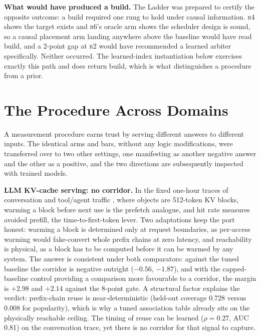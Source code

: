 \documentclass[letterpaper]{article} %
\newcommand{\rung}[1]{\textsc{#1}}
\begin{document}
\textbf{What would have produced a build.} The Ladder was prepared to certify the opposite outcome: a build required one rung to hold under causal information. \rung{r4} shows the target exists and \rung{r6}'s oracle arm shows the scheduler design is sound, so a causal placement arm landing anywhere above the baseline would have read build, and a 2-point gap at \rung{r2} would have recommended a learned arbiter specifically. Neither occurred. The learned-index instantiation below exercises exactly this path and does return build, which is what distinguishes a procedure from a prior.

\section{The Procedure Across Domains}
A measurement procedure earns trust by serving different answers to different inputs. The identical arms and bars, without any logic modifications, were transferred over to two other settings, one manifesting as another negative answer and the other as a positive, and the two directions are subsequently inspected with trained models.

\textbf{LLM KV-cache serving: no corridor.} In the fixed one-hour traces of conversation and tool/agent traffic \citep{mooncake}, where objects are 512-token KV blocks, warming a block before next use is the prefetch analogue, and hit rate measures avoided prefill, the time-to-first-token lever. Two adaptations keep the port honest: warming a block is determined only at request boundaries, as per-access warming would fake-convert whole prefix chains at zero latency, and reachability is physical, as a block has to be computed before it can be warmed by any system. The answer is consistent under both comparators: against the tuned baseline the corridor is negative outright ($-0.56$, $-1.87$), and with the capped-baseline control providing a comparison more favourable to a corridor, the margin is $+2.98$ and $+2.14$ against the 8-point gate. A structural factor explains the verdict: prefix-chain reuse is near-deterministic (held-out coverage 0.728 versus 0.008 for popularity), which is why a tuned association table already sits on the physically reachable ceiling. The timing of reuse can be learned ($\rho{=}0.27$, AUC 0.81) on the conversation trace, yet there is no corridor for that signal to capture.
\end{document}
